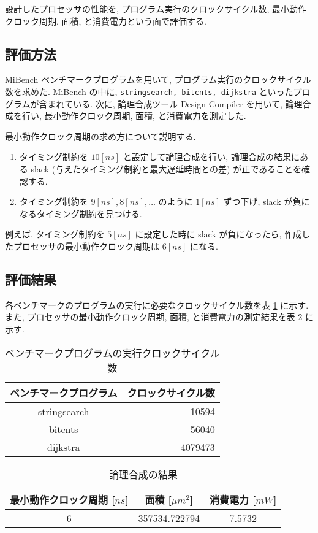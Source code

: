 \documentclass[../main.tex]{subfiles}
\begin{document}
  設計したプロセッサの性能を, プログラム実行のクロックサイクル数, 
  最小動作クロック周期, 面積, と消費電力という面で評価する.

  \subsection{評価方法}
  MiBench ベンチマークプログラムを用いて, プログラム実行のクロックサイクル数を求めた.
  MiBench の中に, \verb|stringsearch, bitcnts, dijkstra| といったプログラムが含まれている.
  次に, 論理合成ツール Design Compiler を用いて, 
  論理合成を行い, 最小動作クロック周期, 面積, と消費電力を測定した.

  最小動作クロック周期の求め方について説明する.
  \begin{enumerate}
    \item タイミング制約を $10[ns]$ と設定して論理合成を行い, 
    論理合成の結果にある slack (与えたタイミング制約と最大遅延時間との差) が正であることを確認する.
    \item タイミング制約を $9[ns], 8[ns], \dots$ のように $1[ns]$ ずつ下げ, 
    slack が負になるタイミング制約を見つける.
  \end{enumerate}

  例えば, タイミング制約を $5[ns]$ に設定した時に slack が負になったら, 
  作成したプロセッサの最小動作クロック周期は $6[ns]$ になる.

  \subsection{評価結果}
  各ベンチマークのプログラムの実行に必要なクロックサイクル数を表 \ref{table:mibench-base} に示す.
  また, プロセッサの最小動作クロック周期, 面積, と消費電力の測定結果を表 \ref{table:logic-synthesis-base} に示す.

  \begin{table}[h]
    \centering
    \begin{tabular}{|c|r|}
    \hline
    ベンチマークプログラム  & クロックサイクル数 \\ \hline
    stringsearch & 10594     \\
    bitcnts      & 56040     \\
    dijkstra     & 4079473   \\ \hline
    \end{tabular}
    \caption{ベンチマークプログラムの実行クロックサイクル数}
    \label{table:mibench-base}
  \end{table}

  \begin{table}[h]
    \centering
    \begin{tabular}{|c|c|c|}
    \hline
    最小動作クロック周期 {[}$ns${]} & 面積 {[}$\mu m^2${]} & 消費電力 {[}$mW${]} \\ \hline
    6                   & 357534.722794    & 7.5732        \\ \hline
    \end{tabular}
    \caption{論理合成の結果}
    \label{table:logic-synthesis-base}
  \end{table}
\end{document}
